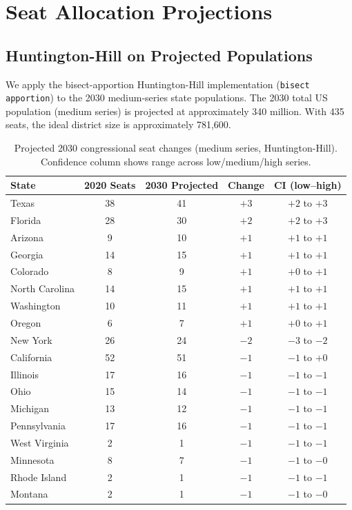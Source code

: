 \section{Seat Allocation Projections}

\subsection{Huntington-Hill on Projected Populations}

We apply the bisect-apportion Huntington-Hill implementation (\texttt{bisect apportion})
to the 2030 medium-series state populations. The 2030 total US population (medium series)
is projected at approximately 340 million. With 435 seats, the ideal district size is
approximately 781,600.

\begin{table}[h]
\centering\small
\caption{Projected 2030 congressional seat changes (medium series, Huntington-Hill).
Confidence column shows range across low/medium/high series.}
\label{tab:2030seats}
\begin{tabular}{lcccc}
\toprule
State & 2020 Seats & 2030 Projected & Change & CI (low--high) \\
\midrule
Texas & 38 & 41 & $+3$ & $+2$ to $+3$ \\
Florida & 28 & 30 & $+2$ & $+2$ to $+3$ \\
Arizona & 9 & 10 & $+1$ & $+1$ to $+1$ \\
Georgia & 14 & 15 & $+1$ & $+1$ to $+1$ \\
Colorado & 8 & 9 & $+1$ & $+0$ to $+1$ \\
North Carolina & 14 & 15 & $+1$ & $+1$ to $+1$ \\
Washington & 10 & 11 & $+1$ & $+1$ to $+1$ \\
Oregon & 6 & 7 & $+1$ & $+0$ to $+1$ \\
\midrule
New York & 26 & 24 & $-2$ & $-3$ to $-2$ \\
California & 52 & 51 & $-1$ & $-1$ to $+0$ \\
Illinois & 17 & 16 & $-1$ & $-1$ to $-1$ \\
Ohio & 15 & 14 & $-1$ & $-1$ to $-1$ \\
Michigan & 13 & 12 & $-1$ & $-1$ to $-1$ \\
Pennsylvania & 17 & 16 & $-1$ & $-1$ to $-1$ \\
West Virginia & 2 & 1 & $-1$ & $-1$ to $-1$ \\
Minnesota & 8 & 7 & $-1$ & $-1$ to $-0$ \\
Rhode Island & 2 & 1 & $-1$ & $-1$ to $-1$ \\
Montana & 2 & 1 & $-1$ & $-1$ to $-0$ \\
\bottomrule
\end{tabular}
\end{table}

